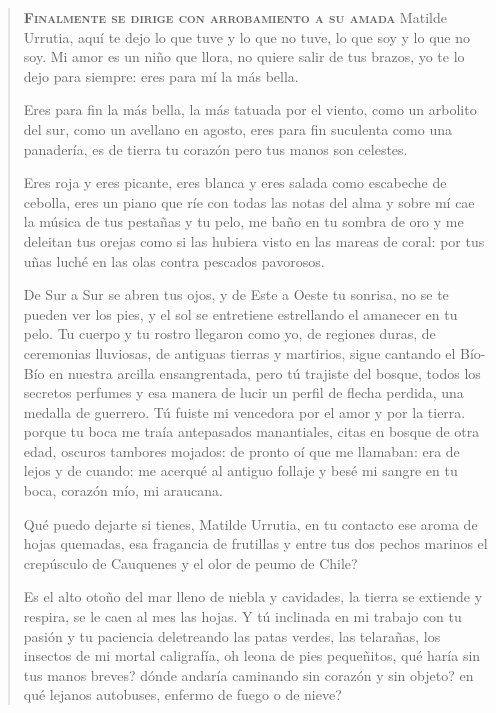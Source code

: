 \documentclass[12pt]{article}
\begin{document}
\begin{verse}
\vspace{\baselineskip}
{\scshape\bfseries Finalmente se dirige con arrobamiento a su amada}
Matilde Urrutia, aquí te dejo  
lo que tuve y lo que no tuve,  
lo que soy y lo que no soy.  
Mi amor es un niño que llora,  
no quiere salir de tus brazos,  
yo te lo dejo para siempre:  
eres para mí la más bella.  

Eres para fin la más bella,  
la más tatuada por el viento,  
como un arbolito del sur,  
como un avellano en agosto,  
eres para fin suculenta  
como una panadería,  
es de tierra tu corazón  
pero tus manos son celestes.  

Eres roja y eres picante,  
eres blanca y eres salada  
como escabeche de cebolla,  
eres un piano que ríe  
con todas las notas del alma  
y sobre mí cae la música  
de tus pestañas y tu pelo,  
me baño en tu sombra de oro  
y me deleitan tus orejas  
como si las hubiera visto  
en las mareas de coral:  
por tus uñas luché en las olas  
contra pescados pavorosos.  

De Sur a Sur se abren tus ojos,  
y de Este a Oeste tu sonrisa,  
no se te pueden ver los pies,  
y el sol se entretiene estrellando  
el amanecer en tu pelo.  
Tu cuerpo y tu rostro llegaron  
como yo, de regiones duras,  
de ceremonias lluviosas,  
de antiguas tierras y martirios,  
sigue cantando el Bío-Bío  
en nuestra arcilla ensangrentada,  
pero tú trajiste del bosque,  
todos los secretos perfumes  
y esa manera de lucir  
un perfil de flecha perdida,  
una medalla de guerrero.  
Tú fuiste mi vencedora  
por el amor y por la tierra.  
porque tu boca me traía  
antepasados manantiales,  
citas en bosque de otra edad,  
oscuros tambores mojados:  
de pronto oí que me llamaban:  
era de lejos y de cuando:  
me acerqué al antiguo follaje  
y besé mi sangre en tu boca,  
corazón mío, mi araucana.  

Qué puedo dejarte si tienes,  
Matilde Urrutia, en tu contacto  
ese aroma de hojas quemadas,  
esa fragancia de frutillas  
y entre tus dos pechos marinos  
el crepúsculo de Cauquenes  
y el olor de peumo de Chile?  

Es el alto otoño del mar  
lleno de niebla y cavidades,  
la tierra se extiende y respira,  
se le caen al mes las hojas.  
Y tú inclinada en mi trabajo  
con tu pasión y tu paciencia  
deletreando las patas verdes,  
las telarañas, los insectos  
de mi mortal caligrafía,  
oh leona de pies pequeñitos,  
qué haría sin tus manos breves?  
dónde andaría caminando  
sin corazón y sin objeto?  
en qué lejanos autobuses,  
enfermo de fuego o de nieve?  


\end{verse}
\end{document}
